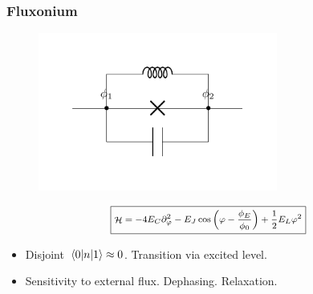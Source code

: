 \documentclass[10pt]{beamer}
\DeclareMathOperator{\ham}{\mathcal{H}}
\begin{document}
\begin{frame}
\frametitle{Fluxonium}
\vspace{1ex}
\begin{minipage}[c]{0.4\linewidth}
\begin{figure}
	\centering
	\includegraphics[trim={1cm 1cm 1cm 1cm}, clip, width=0.7\textwidth]{fluxonium.pdf}
\end{figure}
\end{minipage} 
\begin{minipage}[c]{0.5\linewidth}
\begin{equation}
\footnotesize
\boxed{ \ham = - 4 E_C \partial_\varphi^2  - E_J \cos{\left(\varphi - \frac{\phi_E}{\phi_0}\right)} + \frac{1}{2} E_L \varphi^2 }
\end{equation}
\end{minipage}
\begin{figure}[H]
	\centering
\end{figure}
\begin{itemize}
\item Disjoint $\matrixel{0}{n}{1} \approx 0$. Transition via excited level.
\item Sensitivity to external flux. Dephasing. Relaxation. 
\end{itemize}
\end{frame}
\end{document}
